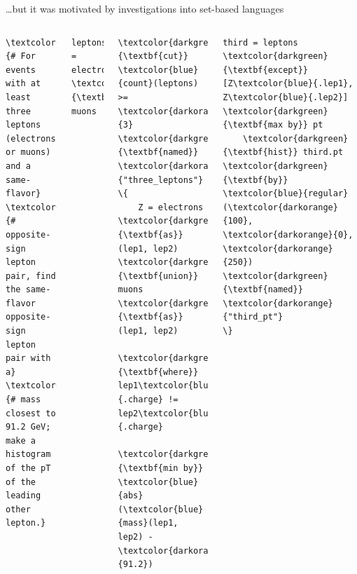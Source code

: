 \documentclass[aspectratio=169]{beamer}
\begin{document}
\begin{frame}[fragile]{\ldots but it was motivated by investigations into set-based languages}
\vspace{0.1 cm}
\begin{center}
\end{center}

\vspace{-0.25 cm}
\begin{columns}
\scriptsize
\begin{Verbatim}[commandchars=\\\{\}]
\textcolor{gray}{# For events with at least three leptons (electrons or muons) and a same-flavor}
\textcolor{gray}{# opposite-sign lepton pair, find the same-flavor opposite-sign lepton pair with a}
\textcolor{gray}{# mass closest to 91.2 GeV; make a histogram of the pT of the leading other lepton.}
\end{Verbatim}

\small
\vspace{-0.25 cm}
\begin{Verbatim}[commandchars=\\\{\}]
leptons = electrons \textcolor{darkgreen}{\textbf{union}} muons
\end{Verbatim}

\vspace{-0.45 cm}
\begin{Verbatim}[commandchars=\\\{\}]
\textcolor{darkgreen}{\textbf{cut}} \textcolor{blue}{count}(leptons) >= \textcolor{darkorange}{3} \textcolor{darkgreen}{\textbf{named}} \textcolor{darkorange}{"three_leptons"} \{
    Z = electrons \textcolor{darkgreen}{\textbf{as}} (lep1, lep2) \textcolor{darkgreen}{\textbf{union}} muons \textcolor{darkgreen}{\textbf{as}} (lep1, lep2)
            \textcolor{darkgreen}{\textbf{where}} lep1\textcolor{blue}{.charge} != lep2\textcolor{blue}{.charge}
            \textcolor{darkgreen}{\textbf{min by}} \textcolor{blue}{abs}(\textcolor{blue}{mass}(lep1, lep2) - \textcolor{darkorange}{91.2})
\end{Verbatim}

\vspace{-0.45 cm}
\begin{Verbatim}[commandchars=\\\{\}]
    third = leptons \textcolor{darkgreen}{\textbf{except}} [Z\textcolor{blue}{.lep1}, Z\textcolor{blue}{.lep2}] \textcolor{darkgreen}{\textbf{max by}} pt
    \textcolor{darkgreen}{\textbf{hist}} third.pt \textcolor{darkgreen}{\textbf{by}} \textcolor{blue}{regular}(\textcolor{darkorange}{100}, \textcolor{darkorange}{0}, \textcolor{darkorange}{250}) \textcolor{darkgreen}{\textbf{named}} \textcolor{darkorange}{"third_pt"}
\}
\end{Verbatim}


\end{columns}
\end{frame}
\end{document}
